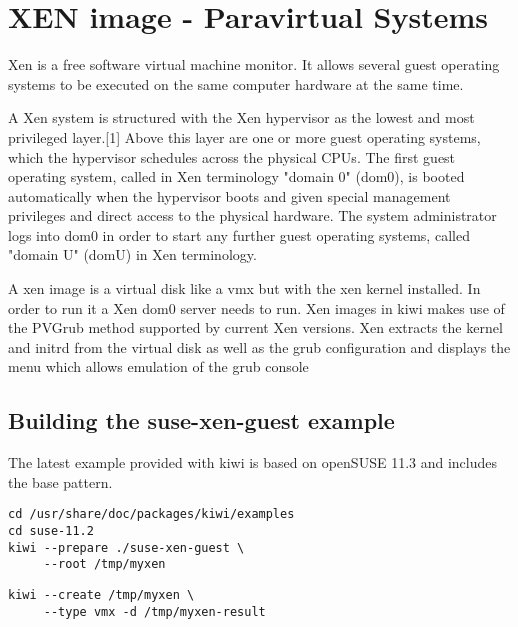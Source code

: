 \chapter{XEN image - Paravirtual Systems}
\label{chapter:xen}
\minitoc

Xen is a free software virtual machine monitor. It allows several
guest operating systems to be executed on the same computer hardware
at the same time.

A Xen system is structured with the Xen hypervisor as the lowest and
most privileged layer.[1] Above this layer are one or more guest
operating systems, which the hypervisor schedules across the physical
CPUs. The first guest operating system, called in Xen terminology
"domain 0" (dom0), is booted automatically when the hypervisor boots
and given special management privileges and direct access to the physical
hardware. The system administrator logs into dom0 in order to start
any further guest operating systems, called "domain U" (domU) in
Xen terminology.

A xen image is a virtual disk like a vmx but with the xen kernel
installed. In order to run it a Xen dom0 server needs to run. Xen
images in kiwi makes use of the PVGrub method supported by current
Xen versions. Xen extracts the kernel and initrd from the virtual
disk as well as the grub configuration and displays the menu which
allows emulation of the grub console

\section{Building the suse-xen-guest example}

The latest example provided with kiwi is based on openSUSE 11.3 and includes
the base pattern. 

\begin{Command}{12cm}
\begin{verbatim}
cd /usr/share/doc/packages/kiwi/examples
cd suse-11.2
kiwi --prepare ./suse-xen-guest \
     --root /tmp/myxen
\end{verbatim}
\end{Command}

\begin{Command}{12cm}
\begin{verbatim}
kiwi --create /tmp/myxen \
     --type vmx -d /tmp/myxen-result
\end{verbatim}
\end{Command}

